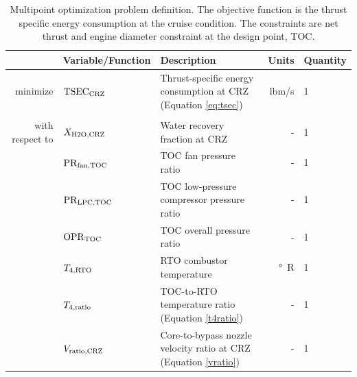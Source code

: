 \documentclass[conf]{new-aiaa}
\begin{document}
\begin{table}[hbt!]
    \centering
    \caption{
        Multipoint optimization problem definition.
        The objective function is the thrust specific energy consumption at the cruise condition.
        The constraints are net thrust and engine diameter constraint at the design point, TOC.
    }
    \small
    \renewcommand{\arraystretch}{1.2}
    \begin{tabular}{r l l r l}
        \toprule
                        & Variable/Function              & Description                                                           & Units          & Quantity \\
        \hline
        minimize        & $\rm{TSEC}_{\rm{CRZ}} $        & Thrust-specific energy consumption at CRZ (Equation \eqref{eq:tsec})  & \si{lbm/s}     & 1        \\
                        &                                &                                                                       &                &          \\
        with respect to & $X_{\rm{H2O,CRZ}}$             & Water recovery fraction at CRZ                                        & -              & 1        \\
                        & $\rm{PR}_{\rm{fan,TOC}}$       & TOC fan pressure ratio                                                & -              & 1        \\
                        & $\rm{PR}_{\rm{LPC,TOC}}$       & TOC low-pressure compressor pressure ratio                            & -              & 1        \\
                        & $\rm{OPR}_{\rm{TOC}}$          & TOC overall pressure ratio                                            & -              & 1        \\
                        & $T_{4,\rm{RTO}}$               & RTO combustor temperature                                             & \si{\degree R} & 1        \\
                        & $T_{4,\rm{ratio}}$             & TOC-to-RTO temperature ratio (Equation \eqref{t4ratio})               & -              & 1        \\
                        & $V_{\rm{ratio,CRZ}}$           & Core-to-bypass nozzle velocity ratio at CRZ (Equation \eqref{vratio}) & -              & 1        \\

\end{tabular}
\end{table}
\end{document}
